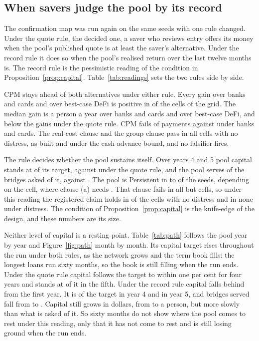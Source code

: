 \subsection{When savers judge the pool by its record}\label{sec:record}

The confirmation map was run again on the same seeds with one rule changed. Under the quote rule, the
decided one, a saver who reviews entry offers its money when the pool's published quote is at least the saver's
alternative. Under the record rule it does so when the pool's realised return over the last twelve months is.
The record rule is the pessimistic reading of the condition in Proposition~\ref{prop:capital}.
Table~\ref{tab:readings} sets the two rules side by side.

CPM stays ahead of both alternatives under either rule. Every gain over banks and cards and over best-case DeFi is
positive in \ReadSecondGainPositive{} of the \CellsAll{} cells of the grid. The median gain is
\ReadSecondGainBanks{} a person a year over banks and cards and \ReadSecondGainDefi{} over best-case DeFi,
\ReadSecondGainBanksLower{} and \ReadSecondGainDefiLower{} below the gains under the quote rule. CPM
fails \ReadSecondFailCpm{} of payments against \ReadSecondFailBanks{} under banks and cards. The real-cost clause
and the group clause pass in all \CellsNoDistress{} cells with no distress, as built and under the cash-advance
bound, and no falsifier fires.

The rule decides whether the pool sustains itself. Over years 4 and 5 pool capital stands at
\ReadSecondCapital{} of its target, against \ReadFirstCapital{} under the quote rule, and the pool serves
\ReadSecondServedCpm{} of the bridges asked of it, against \ReadFirstServedCpm{}. The pool is Persistent in \ReadSecondPersistentLow{} to
\ReadSecondPersistentHigh{} of the \NumSeeds{} seeds, depending on the cell, where clause (a) needs
\WilsonConfirm{}. That clause fails in all but \ReadSecondRegion{} cells, so under this reading the registered
claim holds in \ReadSecondRegion{} of the \CellsNoDistress{} cells with no distress and in none under distress.
The condition of Proposition~\ref{prop:capital} is the knife-edge of the design, and these numbers are its size.

Neither level of capital is a resting point. Table~\ref{tab:path} follows the pool year by year and Figure~\ref{fig:path} month by month. Its capital target rises
throughout the run under both rules, as the network grows and the term book fills: the longest loans run
sixty months, so the book is still filling when the run ends. Under the quote rule capital follows the
target to within one per cent for four years and stands at \PathFirstRatioFive{} of it in the fifth. Under the
record rule capital falls behind from the first year. It is \PathSecondRatioFour{} of the target in year 4
and \PathSecondRatioFive{} in year 5, and bridges served fall from \PathSecondServedFour{} to
\PathSecondServedFive{}. Capital still grows in dollars, from \PathSecondCapitalFour{} to \PathSecondCapitalFive{}
a person, but more slowly than what is asked of it. So sixty months do not show where the pool comes to
rest under this reading, only that it has not come to rest and is still losing ground when the run ends.


